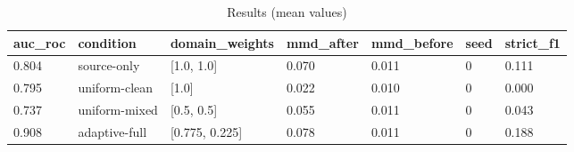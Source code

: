 \begin{table}[h]
\centering
\caption{Results (mean values)}
\label{tab:res}
\begin{tabular}{lllllll}
\toprule
auc\_roc & condition & domain\_weights & mmd\_after & mmd\_before & seed & strict\_f1 \\
\midrule
0.804 & source-only & [1.0, 1.0] & 0.070 & 0.011 & 0 & 0.111 \\
0.795 & uniform-clean & [1.0] & 0.022 & 0.010 & 0 & 0.000 \\
0.737 & uniform-mixed & [0.5, 0.5] & 0.055 & 0.011 & 0 & 0.043 \\
0.908 & adaptive-full & [0.775, 0.225] & 0.078 & 0.011 & 0 & 0.188 \\
\bottomrule
\end{tabular}
\end{table}
